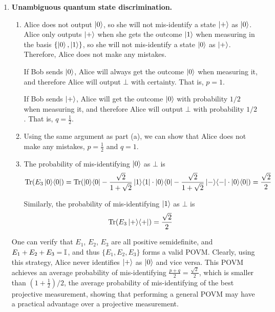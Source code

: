 \documentclass[12pt]{article}
\begin{document}
\begin{enumerate}
\begin{enumerate}
\end{enumerate}

\item {\bf Unambiguous quantum state discrimination.}
\begin{enumerate}
	\item Alice does not output $\ket{0}$, so she will not mis-identify a state $\ket{+}$ as $\ket{0}$. Alice only outputs $\ket{+}$ when she gets the outcome $\ket{1}$ when measuring in the basis $\{\ket{0}, \ket{1}\}$, so she will not mis-identify a state $\ket{0}$ as $\ket{+}$. Therefore, Alice does not make any mistakes.
	
	If Bob sends $\ket{0}$, Alice will always get the outcome $\ket{0}$ when measuring it, and therefore Alice will output $\bot$ with certainty. That is, $p = 1$.
	
	If Bob sends $\ket{+}$, Alice will get the outcome $\ket{0}$ with probability $1/2$ when measuring it, and therefore Alice will output $\bot$ with probability $1/2$. That is, $q = \frac{1}{2}$.
	\item Using the same argument as part (a), we can show that Alice does not make any mistakes, $p = \frac{1}{2}$ and $q = 1$.
	\item The probability of mis-identifying $\ket{0}$ as $\bot$ is
	\begin{align*}
	\mathrm{Tr}(E_3\ket{0}\!\bra{0}) = \mathrm{Tr}(\ket{0}\!\bra{0} - \frac{\sqrt{2}}{1 + \sqrt{2}}\ket{1}\!\bra{1} \cdot \ket{0}\!\bra{0} - \frac{\sqrt{2}}{1 + \sqrt{2}}\ket{-}\!\bra{-} \cdot \ket{0}\!\bra{0})
	= \frac{\sqrt{2}}{2}
	\end{align*}
	
	Similarly, the probability of mis-identifying $\ket{1}$ as $\bot$ is 
	\begin{align*}
	\mathrm{Tr}(E_3\ket{+}\!\bra{+}) = \frac{\sqrt{2}}{2}
	\end{align*}
\end{enumerate}

\begin{remark}
One can verify that $E_1$, $E_2$, $E_3$ are all positive semidefinite, and $E_1 + E_2 + E_3 = \mathbb{I}$, and thus $\{E_1, E_2, E_3\}$ forms a valid POVM. Clearly, using this strategy, Alice never identifies $\ket{+}$ as $\ket{0}$ and vice versa. This POVM achieves an average probability of mis-identifying $\frac{p + q}{2} = \frac{\sqrt{2}}{2}$, which is smaller than $(1 + \frac{1}{2})/2$, the average probability of mis-identifying of the best projective measurement, showing that performing a general POVM may have a practical advantage over a projective measurement.
\end{remark}



\end{enumerate}
\end{document}
